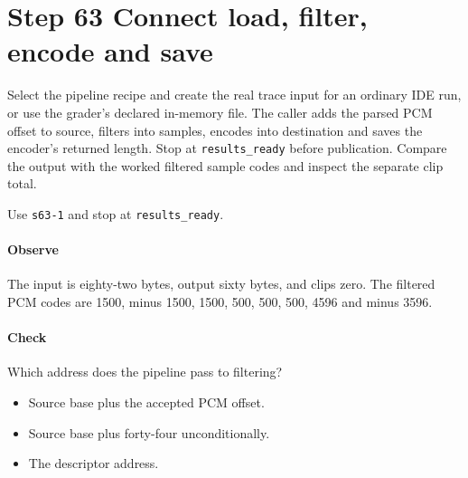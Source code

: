 \section{Step 63 Connect load, filter, encode and save}\label{pcm-wav-s63}
Select the pipeline recipe and create the real trace input for an ordinary IDE run, or use the grader's declared in-memory file. The caller adds the parsed PCM offset to source, filters into samples, encodes into destination and saves the encoder's returned length. Stop at \texttt{results\_ready} before publication. Compare the output with the worked filtered sample codes and inspect the separate clip total.

Use \texttt{s63-1} and stop at \texttt{results\_ready}.

\paragraph{Observe} The input is eighty-two bytes, output sixty bytes, and clips zero. The filtered PCM codes are 1500, minus 1500, 1500, 500, 500, 500, 4596 and minus 3596.

\paragraph{Check} Which address does the pipeline pass to filtering?
\begin{itemize}
  \item[A.] Source base plus the accepted PCM offset.
  \item[B.] Source base plus forty-four unconditionally.
  \item[C.] The descriptor address.
\end{itemize}
